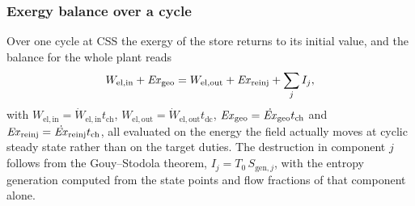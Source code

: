 \subsubsection{Exergy balance over a cycle}

Over one cycle at CSS the exergy of the store returns to its initial value, and
the balance for the whole plant reads
\begin{equation}
  W_\mathrm{el,in}+\mathit{Ex}_\mathrm{geo}
  =W_\mathrm{el,out}+\mathit{Ex}_\mathrm{reinj}+\sum_{j}I_{j},
  \label{eq:ex-balance}
\end{equation}
with $W_\mathrm{el,in}=\dot W_\mathrm{el,in}t_\mathrm{ch}$,
$W_\mathrm{el,out}=\dot W_\mathrm{el,out}t_\mathrm{dc}$,
$\mathit{Ex}_\mathrm{geo}=\dot{\mathit{Ex}}_\mathrm{geo}t_\mathrm{ch}$ and
$\mathit{Ex}_\mathrm{reinj}=\dot{\mathit{Ex}}_\mathrm{reinj}t_\mathrm{ch}$, all evaluated on the
energy the field actually moves at cyclic steady state rather than on the
target duties. The
destruction in component $j$ follows from the Gouy--Stodola theorem,
$I_j=T_0\,S_{\mathrm{gen},j}$, with the entropy generation computed from the
state points and flow fractions of that component alone.

